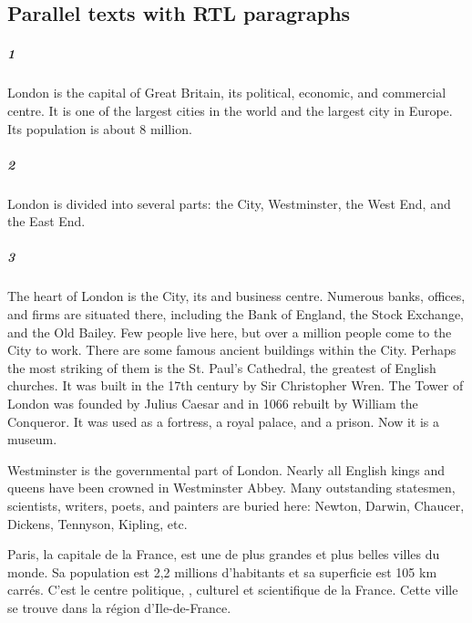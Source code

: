 \documentclass[a4paper,oneside]{book}
\begin{document}
\subsection{Parallel texts with RTL paragraphs}

\newpage
\begin{pairs}
\begin{Leftside}\sloppy 
    \beginnumbering
        \pstart
\subparagraph{1}\sloppy
London is the capital of Great Britain, its political, economic, and commercial centre. It is one of the largest cities in the world and the largest city in Europe. Its population is about 8 million.
\pend

        \pstart
\subparagraph{2}\sloppy
London is divided into several parts: the City, Westminster, the West End, and the East End.
        \pend

        \pstart
\subparagraph{3}\sloppy
The heart of London is the City, its  and business centre. Numerous banks, offices, and firms are situated there, including the Bank of England, the Stock Exchange, and the Old Bailey. Few people live here, but over a million people come to the City to work. There are some famous ancient buildings within the City. Perhaps the most striking of them is the St. Paul's Cathedral, the greatest of English churches. It was built in the 17th century by Sir Christopher Wren. The Tower of London was founded by Julius Caesar and in 1066 rebuilt by William the Conqueror. It was used as a fortress, a royal palace, and a prison. Now it is a museum.
        \pend   

        \pstart 
Westminster is the governmental part of London. Nearly all English kings and queens have been crowned in Westminster Abbey. Many outstanding statesmen, scientists, writers, poets, and painters are buried here: Newton, Darwin, Chaucer, Dickens, Tennyson, Kipling, etc.
        \pend

        \pausenumbering
    \end{Leftside} 

\begin{Rightside}\sloppy 
    \beginnumbering

        \pstart 
        Paris, la capitale de la France, est une de plus grandes et plus belles villes du monde. Sa population est 2,2 millions d’habitants et sa superficie est 105 km carrés. C’est le centre politique, , culturel et scientifique de la France. Cette ville se trouve dans la région d’Ile-de-France.
        \pend


\end{Rightside}
\end{pairs}
\end{document}
